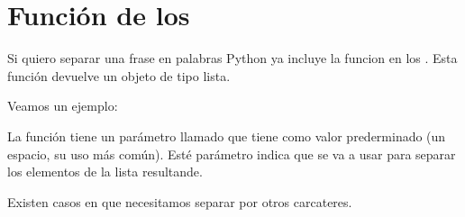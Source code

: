 \documentclass[a4paper,12pt,spanish]{sphinxmanual}
\begin{document}
\section{Función  de los }
\label{\detokenize{list:funcion-split-de-los-strings}}
\sphinxAtStartPar
Si quiero separar una frase en palabras Python ya incluye la funcion  en
los . Esta función devuelve un objeto de tipo lista.

\sphinxAtStartPar
Veamos un ejemplo:

\begin{sphinxVerbatim}[commandchars=\\\{\}]
  
  
\PYG{p}{[}            \PYG{p}{]}
\end{sphinxVerbatim}

\sphinxAtStartPar
La función  tiene un parámetro llamado  que tiene como valor prederminado
 (un espacio, su uso más común). Esté parámetro indica que  se va a usar para
separar los elementos de la lista resultande.

\sphinxAtStartPar
Existen casos en que necesitamos separar por otros carcateres.
\end{document}

